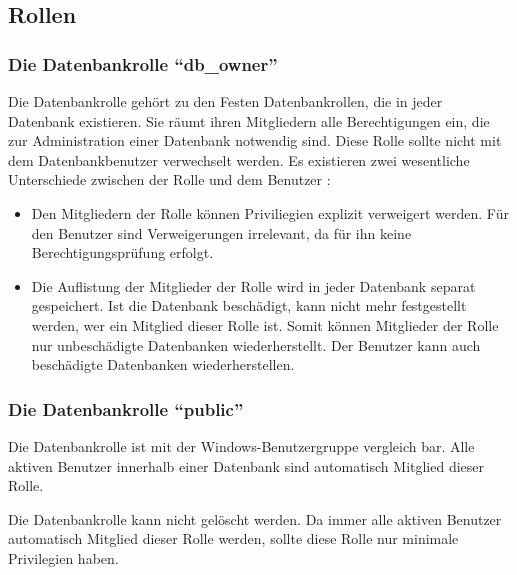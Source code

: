       \subsection{Rollen}
        \subsubsection{Die Datenbankrolle \enquote{db\_owner}}
          Die Datenbankrolle  gehört zu den Festen
          Datenbankrollen, die in jeder Datenbank existieren. Sie räumt ihren
          Mitgliedern alle Berechtigungen ein, die zur Administration einer
          Datenbank notwendig sind. Diese Rolle sollte nicht mit dem
          Datenbankbenutzer  verwechselt werden. Es existieren
          zwei wesentliche Unterschiede zwischen der Rolle
           und dem Benutzer :
          \begin{itemize}
            \item Den Mitgliedern der Rolle  können
            Priviliegien explizit verweigert werden. Für den Benutzer
             sind Verweigerungen irrelevant, da für ihn keine
            Berechtigungsprüfung erfolgt.
            \item Die Auflistung der Mitglieder der Rolle 
            wird in jeder Datenbank separat gespeichert. Ist die Datenbank
            beschädigt, kann nicht mehr festgestellt werden, wer ein Mitglied
            dieser Rolle ist. Somit können Mitglieder der Rolle
             nur unbeschädigte Datenbanken
            wiederherstellt. Der Benutzer  kann auch beschädigte
            Datenbanken wiederherstellen.
          \end{itemize} 
          \begin{literaturinternet}
            \item \cite{gc20110407msdvdo}
          \end{literaturinternet}
        \subsubsection{Die Datenbankrolle \enquote{public}}
          Die Datenbankrolle  ist mit der
          Windows-Benutzergruppe  vergleich bar. Alle aktiven
          Benutzer innerhalb einer Datenbank sind automatisch Mitglied dieser
          Rolle.
          \begin{merke}
            Die Datenbankrolle  kann nicht gelöscht werden.
            Da immer alle aktiven Benutzer automatisch Mitglied dieser Rolle
            werden, sollte diese Rolle nur minimale Privilegien haben.
          \end{merke}
